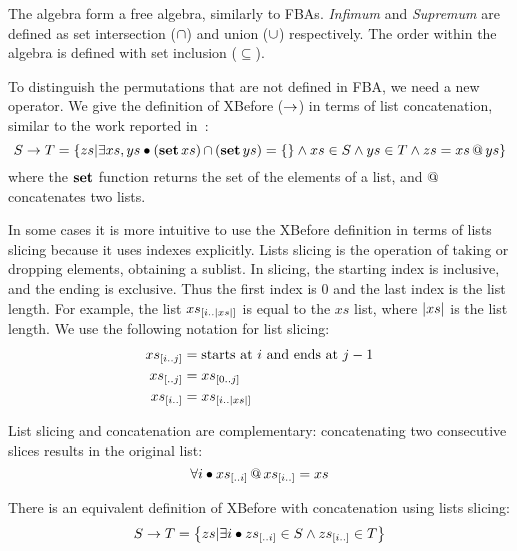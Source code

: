 \documentclass[12pt,openright,twoside,a4paper,oldfontcommands,english,brazil,draft]{abntex2}
\makeatletter
\theoremstyle{theo}
\newcommand{\sliceright}[2]{\ensuremath #1_{\left[..#2\right]}}
\newcommand{\sliceleft}[2]{\ensuremath #1_{\left[#2..\right]}}
\newcommand{\slice}[3]{\ensuremath #1_{\left[#2..#3\right]}}
\def\xbeforeop{\ensuremath\rightarrow}
\newcommand{\xbefore}[2]{\ensuremath #1 \xbeforeop #2 }
\newcommand{\length}[1]{\ensuremath\left|#1\right|}
\newcommand{\append}[2]{\ensuremath #1 \operatorname{\mathbf{@}} #2}
\def\listsetop{\ensuremath\operatorname{\mathbf{set}}}
\newcommand{\listset}[1]{\ensuremath\listsetop #1}
\newcommand{\setsin}[1]{\ensuremath\left\{ #1 \right\}}
\newcommand{\parsin}[1]{\ensuremath\left( #1 \right)}
\def\union{\ensuremath\operatorname{\cup}}
\def\inter{\ensuremath\operatorname{\cap}}
\makeatother
\begin{document}
The \ac{algebra} form a free algebra, similarly to \acp{FBA}.
\emph{Infimum} and \emph{Supremum} are defined as set intersection ($\inter$) and union ($\union$) respectively.
The order within the algebra is defined with set inclusion ($\subseteq$).

To distinguish the permutations that are not defined in \ac{FBA}, we need a new operator.
We give the definition of XBefore ($\xbeforeop$) in terms of list concatenation, similar to the work reported in~\cite{DM2015}:
%
\begin{equation}
\label{def:xbefore-append}
\xbefore{S}{T} =
  \setsin{
    zs | \exists xs, ys \bullet \parsin{\listset{xs}} \inter \parsin{\listset{ys}} = \{\}
      \land xs \in S \land ys \in T \land zs = \append{xs}{ys}
  }
\end{equation}
%
where the $\listset{}$ function returns the set of the elements of a list, and $\append{}{}$ concatenates two lists.

In some cases it is more intuitive to use the XBefore definition in terms of lists slicing because it uses indexes explicitly.
Lists slicing is the operation of taking or dropping elements, obtaining a sublist.
In slicing, the starting index is inclusive, and the ending is exclusive.
Thus the first index is 0 and the last index is the list length.
For example, the list $\slice{xs}{i}{\length{xs}}$ is equal to the $xs$ list, where $\length{xs}$ is the list length.
We use the following notation for list slicing:
%
\begin{subequations}
\begin{align}
\slice{xs}{i}{j} &= \text{starts at $i$ and ends at $j-1$}\\
\sliceright{xs}{j} &= \slice{xs}{0}{j}\\
\sliceleft{xs}{i} &= \slice{xs}{i}{\length{xs}}
\end{align}
\end{subequations}

List slicing and concatenation are complementary: concatenating two consecutive slices results in the original list:
\begin{equation}
\forall i \bullet \append{\sliceright{xs}{i}}{\sliceleft{xs}{i}} = xs
\end{equation}

There is an equivalent definition of XBefore with concatenation using lists slicing:
%
\begin{equation}
\xbefore{S}{T} =
  \setsin{
    zs | \exists i \bullet \sliceright{zs}{i} \in S \land \sliceleft{zs}{i} \in T
  }
\end{equation}
\end{document}

